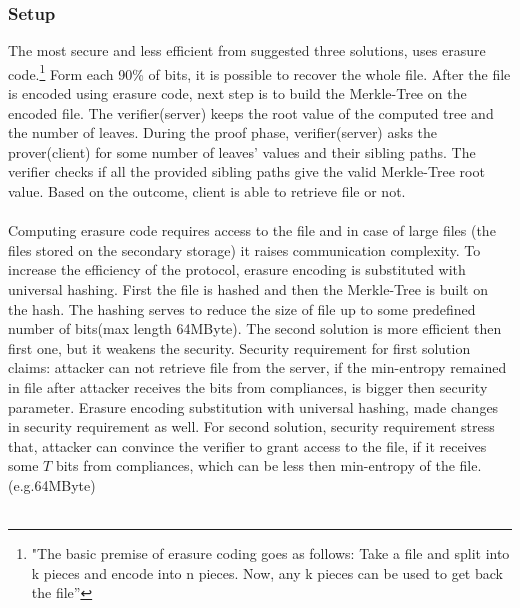 \documentclass[12pt]{article}
\begin{document}
\subsubsection{Setup}
\label{subsub:setup1}
The most secure and less efficient  from suggested three solutions, uses erasure code.\footnote{"The basic premise of erasure coding goes as follows: Take a file and split into k pieces and
encode into n pieces. Now, any k pieces can be used to get back the file”} Form each 90\% of bits, it is possible to recover the whole file. After the file is encoded using erasure code, next step is to build the Merkle-Tree\cite{Merkle} on the encoded file. The verifier(server) keeps the root value of the computed tree and the number of leaves. During the proof phase, verifier(server) asks the  prover(client)  for some number of leaves' values and their sibling paths. The verifier checks if all the provided sibling paths give the valid Merkle-Tree root value. Based on the outcome, client is able to retrieve file or not. \\\\
Computing erasure code requires access to the file and in case of large files (the files stored on the secondary storage) it raises communication complexity. To increase the efficiency of the protocol, erasure encoding is substituted with universal hashing\cite{Hash}. First the file is hashed and then the Merkle-Tree is built on the hash. The hashing serves to reduce the size of file up to some predefined number of bits(max length 64MByte). The second solution is more efficient then first one, but it  weakens the security. Security requirement for first solution claims: attacker can not retrieve file from the server, if the min-entropy remained in file after attacker receives the bits from compliances, is bigger then security parameter. Erasure encoding  substitution with universal hashing, made changes in security requirement as well. For second solution, security requirement stress that, attacker can convince the verifier to grant access to the file, if it receives some $T$ bits from compliances, which can be less then min-entropy of the file. (e.g.64MByte)\\\\
\end{document}
